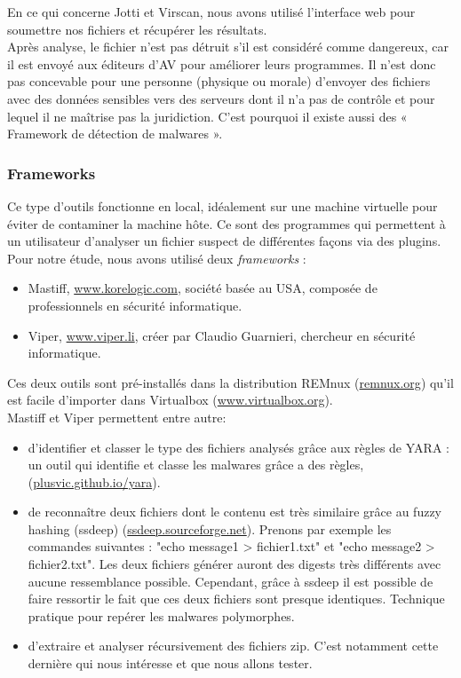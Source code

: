 \documentclass[smallextended]{svjour3}       %
\begin{document}
$ $\\
En ce qui concerne Jotti et Virscan, nous avons utilisé l'interface web pour soumettre nos fichiers et récupérer les résultats.\\
$ $\\
Après analyse, le fichier n'est pas détruit s'il est considéré comme dangereux, car il est envoyé aux éditeurs d'AV pour améliorer leurs programmes. Il n'est donc pas concevable pour une personne (physique ou morale) d'envoyer des fichiers avec des données sensibles vers des serveurs dont il n'a pas de contrôle et pour lequel il ne maîtrise pas la juridiction. C'est pourquoi il existe aussi des « Framework de détection de malwares ».\\

\subsubsection{Frameworks}
Ce type d'outils fonctionne en local, idéalement sur une machine virtuelle pour éviter de contaminer la machine hôte. Ce sont des programmes qui permettent à un utilisateur d'analyser un fichier suspect de différentes façons via des plugins. Pour notre étude, nous avons utilisé deux \textit{frameworks} : 
\label{2.2.2frameworks}
\begin{itemize}
\item Mastiff, \url{www.korelogic.com}, société basée au USA, composée de professionnels en sécurité informatique.
\item Viper, \url{www.viper.li}, créer par Claudio Guarnieri, chercheur en sécurité informatique.
\end{itemize}
Ces deux outils sont pré-installés dans la distribution REMnux (\url{remnux.org}) qu'il est facile d'importer dans Virtualbox (\url{www.virtualbox.org}).\\
Mastiff et Viper permettent entre autre:
\begin{itemize}
\item d’identifier et classer le type des fichiers analysés grâce aux règles de YARA : un outil qui identifie et classe les malwares grâce a des règles, (\url{plusvic.github.io/yara}).
\item de reconnaître deux fichiers dont le contenu est très similaire grâce au fuzzy hashing (ssdeep) (\url{ssdeep.sourceforge.net}). Prenons par exemple les commandes suivantes : "echo message1 > fichier1.txt" et "echo message2 > fichier2.txt". Les deux fichiers générer auront des digests très différents avec aucune ressemblance possible. Cependant, grâce à ssdeep il est possible de faire ressortir le fait que ces deux fichiers sont presque identiques. Technique pratique pour repérer les malwares polymorphes.
\item d'extraire et analyser récursivement des fichiers zip. C'est notamment cette dernière qui nous intéresse et que nous allons tester.
\end{itemize}
\end{document}
